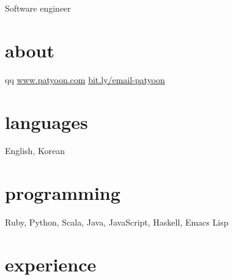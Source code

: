 \documentclass[]{patyoon-cv}
\begin{document}
{Software engineer}

\begin{aside}
  \section{about}
qq  \href{https://patyoon.com}{www.patyoon.com}
  \href{https://bit.ly/email-patyoon}{bit.ly/email-patyoon}
  \section{languages}
  English, Korean
  \section{programming}
  Ruby,
  Python,
  Scala,
  Java,
  JavaScript,
  Haskell,
  Emacs Lisp
\end{aside}

\section{experience}
\end{document}
